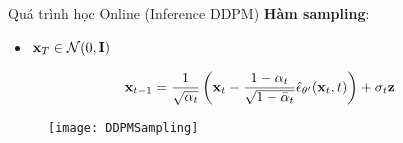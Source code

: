 \begin{frame}{Quá trình học Online (Inference DDPM)}
	\textbf{Hàm sampling}:
	\begin{itemize}
		\item $\mathbf{x}_T \in \mathcal{N}(0, \mathbf{I})$
	\end{itemize}
	
	\begin{equation*}
		\mathbf{x}_{t-1} = \frac{1}{\sqrt{\alpha_t}} \left( \mathbf{x}_t - \frac{1 - \alpha_t}{\sqrt{1 - \bar{\alpha}_t}} \hat{\epsilon}_{\theta'}(\mathbf{x}_t, t) \right) + \sigma_t \mathbf{z}
	\end{equation*}
	
	\begin{figure}
		\centering
		\texttt{[image: DDPMSampling]}
	\end{figure}
\end{frame}

%	
%		
